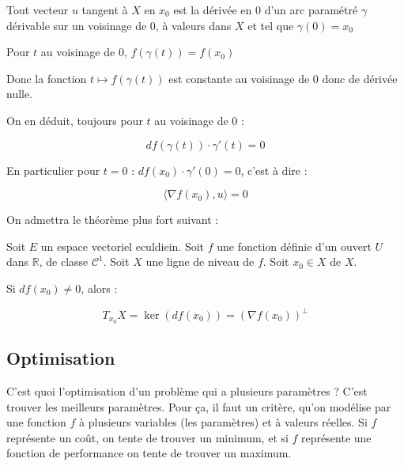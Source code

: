 \documentclass[a4paper,12pt]{book}
\newcommand{\Thr}[2]{\begin{tcolorbox}[sharp corners, colback=white,colframe=red!90!black!75, title=Théorème : #1]#2\end{tcolorbox}}
\newcommand{\Pre}[1]{\begin{tcolorbox}[sharp corners, colback=white,colframe=green!60!green!30!black!75, title=Preuve]#1\end{tcolorbox}}
\def\R{\mathbb{R}}
\begin{document}
\Pre{Tout vecteur $u$ tangent à $X$ en $x_0$ est la dérivée en $0$ d'un arc paramétré $\gamma$ dérivable sur un voisinage de $0$, à valeurs dans $X$ et tel que $\gamma(0)=x_0$
\par Pour $t$ au voisinage de $0$, $f(\gamma(t))=f(x_0)$
\par Donc la fonction $t\mapsto f(\gamma(t))$ est constante au voisinage de $0$ donc de dérivée nulle.
\par On en déduit, toujours pour $t$ au voisinage de $0$ :
\par $$df(\gamma(t))\cdot\gamma'(t)=0$$
\par En particulier pour $t=0$ : $df(x_0)\cdot \gamma'(0)=0$, c'est à dire :
\par $$\langle\nabla f(x_0), u\rangle=0$$}
On admettra le théorème plus fort suivant :
\Thr{}{Soit $E$ un espace vectoriel eculdiein. Soit $f$ une fonction définie d'un ouvert $U$ dans $\R$, de classe $\mathcal{C}^1$. Soit $X$ une ligne de niveau de $f$. Soit $x_0\in X$ de $X$.
\par Si $df(x_0)\neq 0$, alors :
\par $$T_{x_0}X =\ker(df(x_0))=(\nabla f(x_0))^\perp$$}

\subsection{Optimisation}
C'est quoi l'optimisation d'un problème qui a plusieurs paramètres ? C'est trouver les meilleurs paramètres. Pour ça, il faut un critère, qu'on modélise par une fonction $f$ à plusieurs variables (les paramètres) et à valeurs réelles. Si $f$ représente un coût, on tente de trouver un minimum, et si $f$ représente une fonction de performance on tente de trouver un maximum.
\end{document}
